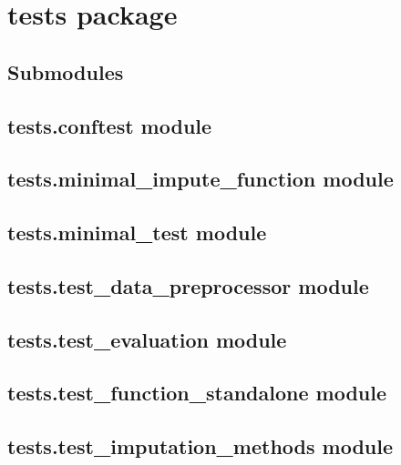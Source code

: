 \documentclass[letterpaper,10pt,english]{sphinxmanual}
\begin{document}
\sphinxstepscope


\chapter{tests package}
\label{\detokenize{tests:tests-package}}\label{\detokenize{tests::doc}}

\section{Submodules}
\label{\detokenize{tests:submodules}}

\section{tests.conftest module}
\label{\detokenize{tests:tests-conftest-module}}

\section{tests.minimal\_impute\_function module}
\label{\detokenize{tests:tests-minimal-impute-function-module}}

\section{tests.minimal\_test module}
\label{\detokenize{tests:tests-minimal-test-module}}

\section{tests.test\_data\_preprocessor module}
\label{\detokenize{tests:tests-test-data-preprocessor-module}}

\section{tests.test\_evaluation module}
\label{\detokenize{tests:tests-test-evaluation-module}}

\section{tests.test\_function\_standalone module}
\label{\detokenize{tests:tests-test-function-standalone-module}}

\section{tests.test\_imputation\_methods module}
\label{\detokenize{tests:tests-test-imputation-methods-module}}
\end{document}
